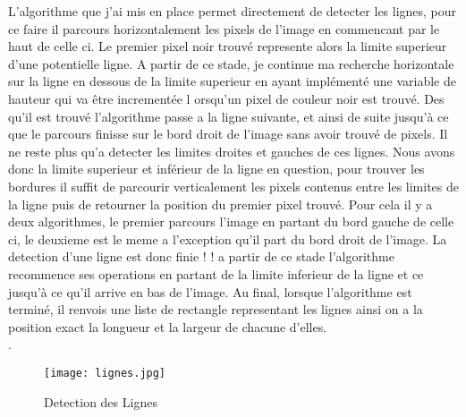 \documentclass{article}
\begin{document}
L’algorithme que j’ai mis en place permet directement de detecter les lignes, pour ce faire il parcours horizontalement les pixels de l’image en commencant par le haut de celle ci. Le premier pixel noir trouvé represente alors la limite superieur d’une potentielle ligne. A partir de ce stade, je continue ma recherche horizontale sur la ligne en dessous de la limite superieur en ayant implémenté une variable de hauteur qui va être incrementée l orsqu’un pixel de couleur noir est trouvé. Des qu’il est trouvé l’algorithme passe a la ligne suivante, et ainsi de suite jusqu’à ce que le parcours finisse sur le bord droit de l’image sans avoir trouvé de pixels. Il ne reste plus qu’a detecter les limites droites et gauches de ces lignes. Nous avons donc la limite superieur et inférieur de la ligne en question, pour trouver les bordures il suffit de parcourir verticalement les pixels contenus entre les limites de la ligne puis de retourner la position du premier pixel trouvé. Pour cela il y a deux algorithmes, le premier parcours l’image
en partant du bord gauche de celle ci, le deuxieme est le meme a l’exception qu’il part du bord droit de l’image. La detection d’une ligne est donc finie ! ! a partir de ce stade l’algorithme recommence ses operations en partant de la limite inferieur de la ligne et ce jusqu’à ce qu’il arrive en bas de l’image. Au final, lorsque l’algorithme est terminé, il renvois une liste de rectangle representant les lignes ainsi on a la position exact la longueur et la largeur de chacune d’elles.\\

. \\
   \begin{figure}[hp]
	    \centering
	    \texttt{[image: lignes.jpg]}
	    \caption{Detection des Lignes}
    \end{figure}
\\
\end{document}
